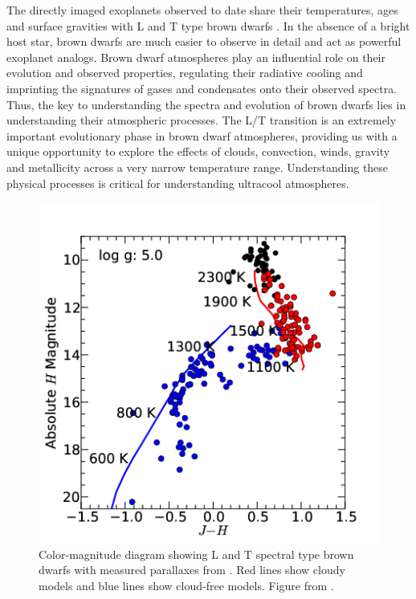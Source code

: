 \documentclass[12pt]{article}
\begin{document}
\begin{justify}
The directly imaged exoplanets observed to date share their temperatures, ages and surface gravities with L and T type brown dwarfs \citep{Kirkpatrick2005}. In the absence of a bright host star, brown dwarfs are much easier to observe in detail and act as powerful exoplanet analogs.
Brown dwarf atmospheres play an influential role on their evolution and observed properties, regulating their radiative cooling and imprinting the signatures of gases and condensates onto their observed spectra.
Thus, the key to understanding the spectra and evolution of brown dwarfs lies in understanding their atmospheric processes.
The L/T transition is an extremely important evolutionary phase in brown dwarf atmospheres, providing us with a unique opportunity to explore the effects of clouds, convection, winds, gravity and metallicity across a very narrow temperature range. Understanding these physical processes is critical for understanding ultracool atmospheres. \smallskip

\begin{figure}[tb]
 \begin{center}
 \includegraphics[scale=0.6]{Morley2012.png}
\end{center}
\caption{Color-magnitude diagram showing L and T spectral type brown dwarfs with measured parallaxes from \citep{Dupuy2012}. Red lines show cloudy models and blue lines show cloud-free models. Figure from \citep{Morley2012}.}
 \label{fig:Morley2012}
\end{figure}


\end{justify}
\end{document}
